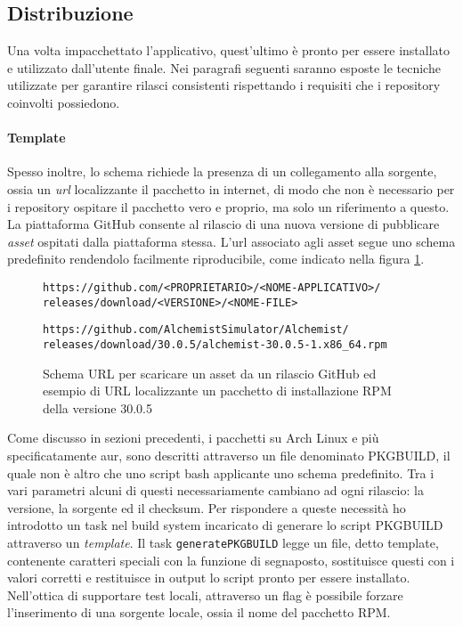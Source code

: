 

\subsection{Distribuzione}

Una volta impacchettato l'applicativo, quest'ultimo è pronto per essere installato e utilizzato dall'utente finale. Nei paragrafi seguenti saranno esposte le tecniche utilizzate per garantire rilasci consistenti rispettando i requisiti che i repository coinvolti possiedono.

\paragraph{Template} Spesso inoltre, lo schema richiede la presenza di un collegamento alla sorgente, ossia un \textit{url} localizzante il pacchetto in internet, di modo che non è necessario per i repository ospitare il pacchetto vero e proprio, ma solo un riferimento a questo. La piattaforma GitHub consente al rilascio di una nuova versione di pubblicare \textit{asset} ospitati dalla piattaforma stessa. L'url associato agli asset segue uno schema predefinito rendendolo facilmente riproducibile, come indicato nella figura \ref{fig:github-assets-url}.
\begin{figure}[htb]\label{fig:github-assets-url}
	\centering
	\texttt{https://github.com/<PROPRIETARIO>/<NOME-APPLICATIVO>/\\ \tab releases/download/<VERSIONE>/<NOME-FILE>}
	
	\vspace{0.5cm}
	
	\texttt{https://github.com/AlchemistSimulator/Alchemist/\\ \tab releases/download/30.0.5/alchemist-30.0.5-1.x86\_64.rpm}
	\caption{Schema URL per scaricare un asset da un rilascio GitHub ed esempio di URL localizzante un pacchetto di installazione RPM della versione 30.0.5}
\end{figure}

Come discusso in sezioni precedenti, i pacchetti su Arch Linux e più specificatamente \ac{aur}, sono descritti attraverso un file denominato PKGBUILD, il quale non è altro che uno script bash applicante uno schema predefinito. Tra i vari parametri alcuni di questi necessariamente cambiano ad ogni rilascio: la versione, la sorgente ed il checksum. Per rispondere a queste necessità ho introdotto un task nel build system incaricato di generare lo script PKGBUILD attraverso un \textit{template}. Il task \texttt{generatePKGBUILD} legge un file, detto template, contenente caratteri speciali con la funzione di segnaposto, sostituisce questi con i valori corretti e restituisce in output lo script pronto per essere installato. Nell'ottica di supportare test locali, attraverso un flag è possibile forzare l'inserimento di una sorgente locale, ossia il nome del pacchetto RPM.

